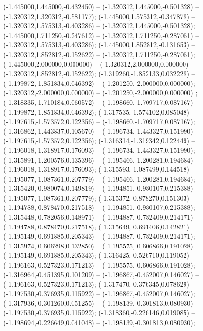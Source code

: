  (-1.445000,1.445000,-0.432450) -- (-1.320312,1.445000,-0.501328) -- (-1.320312,1.320312,-0.581177);
 (-1.445000,1.575312,-0.347878) -- (-1.320312,1.575313,-0.403286) -- (-1.320312,1.445000,-0.501328);
 (-1.445000,1.711250,-0.247612) -- (-1.320312,1.711250,-0.287051) -- (-1.320312,1.575313,-0.403286);
 (-1.445000,1.852812,-0.131653) -- (-1.320312,1.852812,-0.152622) -- (-1.320312,1.711250,-0.287051);
 (-1.445000,2.000000,0.000000) -- (-1.320312,2.000000,0.000000) -- (-1.320312,1.852812,-0.152622);
 (-1.319260,-1.852133,0.032228) -- (-1.199872,-1.851834,0.046392) -- (-1.201250,-2.000000,0.000000);
 (-1.320312,-2.000000,0.000000) -- (-1.201250,-2.000000,0.000000) ;
 (-1.318335,-1.710184,0.060572) -- (-1.198660,-1.709717,0.087167) -- (-1.199872,-1.851834,0.046392);
 (-1.317535,-1.574102,0.085048) -- (-1.197615,-1.573572,0.122356) -- (-1.198660,-1.709717,0.087167);
 (-1.316862,-1.443837,0.105670) -- (-1.196734,-1.443327,0.151990) -- (-1.197615,-1.573572,0.122356);
 (-1.316314,-1.319342,0.122449) -- (-1.196018,-1.318917,0.176093) -- (-1.196734,-1.443327,0.151990);
 (-1.315891,-1.200576,0.135396) -- (-1.195466,-1.200281,0.194684) -- (-1.196018,-1.318917,0.176093);
 (-1.315593,-1.087499,0.144518) -- (-1.195077,-1.087361,0.207779) -- (-1.195466,-1.200281,0.194684);
 (-1.315420,-0.980074,0.149819) -- (-1.194851,-0.980107,0.215388) -- (-1.195077,-1.087361,0.207779);
 (-1.315372,-0.878270,0.151303) -- (-1.194788,-0.878470,0.217518) -- (-1.194851,-0.980107,0.215388);
 (-1.315448,-0.782056,0.148971) -- (-1.194887,-0.782409,0.214171) -- (-1.194788,-0.878470,0.217518);
 (-1.315649,-0.691406,0.142821) -- (-1.195149,-0.691885,0.205343) -- (-1.194887,-0.782409,0.214171);
 (-1.315974,-0.606298,0.132850) -- (-1.195575,-0.606866,0.191028) -- (-1.195149,-0.691885,0.205343);
 (-1.316425,-0.526710,0.119052) -- (-1.196163,-0.527323,0.171213) -- (-1.195575,-0.606866,0.191028);
 (-1.316964,-0.451395,0.101209) -- (-1.196867,-0.452007,0.146027) -- (-1.196163,-0.527323,0.171213);
 (-1.317470,-0.376345,0.078629) -- (-1.197530,-0.376935,0.115922) -- (-1.196867,-0.452007,0.146027);
 (-1.317936,-0.301260,0.051255) -- (-1.198139,-0.301813,0.080930) -- (-1.197530,-0.376935,0.115922);
 (-1.318360,-0.226146,0.019085) -- (-1.198694,-0.226649,0.041048) -- (-1.198139,-0.301813,0.080930);
